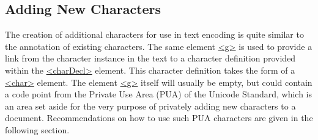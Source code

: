 \subsection[{Adding New Characters}]{Adding New Characters}\label{D25-40}\par
The creation of additional characters for use in text encoding is quite similar to the annotation of existing characters. The same element \hyperref[TEI.g]{<g>} is used to provide a link from the character instance in the text to a character definition provided within the \hyperref[TEI.charDecl]{<charDecl>} element. This character definition takes the form of a \hyperref[TEI.char]{<char>} element. The element \hyperref[TEI.g]{<g>} itself will usually be empty, but could contain a code point from the Private Use Area (PUA) of the Unicode Standard, which is an area set aside for the very purpose of privately adding new characters to a document. Recommendations on how to use such PUA characters are given in the following section.\par
